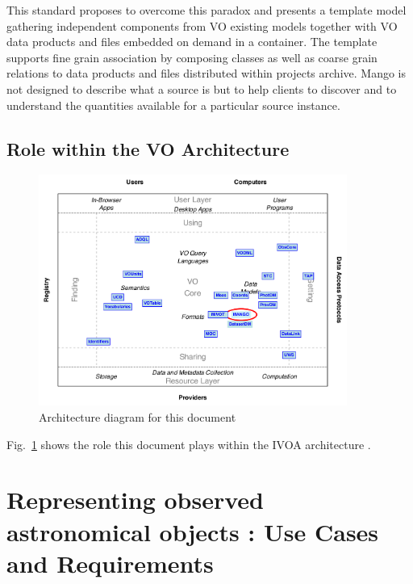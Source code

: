 \documentclass[11pt,a4paper]{ivoa}
\begin{document}
This standard proposes to overcome this paradox and presents a template model gathering independent components from VO existing models
together with VO data products and files embedded on demand in a container.
The template supports fine grain association by composing classes as well as coarse grain relations to data products and files distributed within projects archive.
Mango is not designed to describe what a source is but to help clients to discover and to understand the quantities available for a particular source instance.

\subsection{Role within the VO Architecture}

\begin{figure}
\centering


\includegraphics[width=0.9\textwidth]{role_diagram.pdf}
\caption{Architecture diagram for this document}
\label{fig:archdiag}
\end{figure}

Fig.~\ref{fig:archdiag} shows the role this document plays within the
IVOA architecture \citep{2010ivoa.rept.1123A}.


\section{Representing observed astronomical objects : Use Cases and  Requirements}
\end{document}
